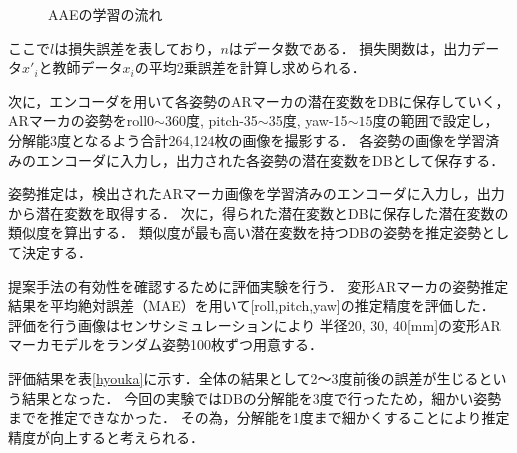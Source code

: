 \documentclass{jsarticle}
\begin{document}
\begin{figure}[ht]
\vspace{0zh}
\setlength{\epsfxsize}{7.5cm}
\centerline{}
\vspace{0zh}
\caption{AAEの学習の流れ}
\label{BB}
\vspace{-3zh}
\end{figure}

ここで$l$は損失誤差を表しており，$n$はデータ数である．
損失関数は，出力データ$x'_i$と教師データ$x_i$の平均2乗誤差を計算し求められる．

次に，エンコーダを用いて各姿勢のARマーカの潜在変数をDBに保存していく，
ARマーカの姿勢をroll0$\sim$360度, pitch-35$\sim$35度, yaw-15$\sim15$度の範囲で設定し，
分解能3度となるよう合計264,124枚の画像を撮影する．
各姿勢の画像を学習済みのエンコーダに入力し，出力された各姿勢の潜在変数をDBとして保存する．

姿勢推定は，検出されたARマーカ画像を学習済みのエンコーダに入力し，出力から潜在変数を取得する．
次に，得られた潜在変数とDBに保存した潜在変数の類似度を算出する．
類似度が最も高い潜在変数を持つDBの姿勢を推定姿勢として決定する．








提案手法の有効性を確認するために評価実験を行う．
変形ARマーカの姿勢推定結果を平均絶対誤差（MAE）を用いて[roll,pitch,yaw]の推定精度を評価した．
評価を行う画像はセンサシミュレーションにより	
半径20, 30, 40[mm]の変形ARマーカモデルをランダム姿勢100枚ずつ用意する．

評価結果を表\ref{hyouka}に示す．全体の結果として2～3度前後の誤差が生じるという結果となった．
今回の実験ではDBの分解能を3度で行ったため，細かい姿勢までを推定できなかった．
その為，分解能を1度まで細かくすることにより推定精度が向上すると考えられる．
\end{document}
